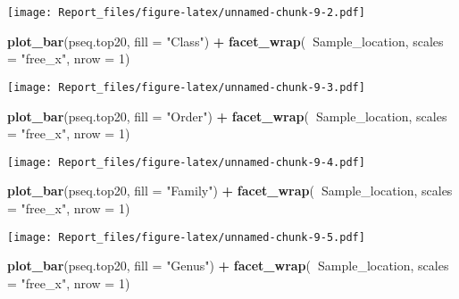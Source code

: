\documentclass[]{article}
\newenvironment{Shaded}{\begin{snugshade}}{\end{snugshade}}
\newcommand{\DataTypeTok}[1]{\textcolor[rgb]{0.13,0.29,0.53}{#1}}
\newcommand{\DecValTok}[1]{\textcolor[rgb]{0.00,0.00,0.81}{#1}}
\newcommand{\KeywordTok}[1]{\textcolor[rgb]{0.13,0.29,0.53}{\textbf{#1}}}
\newcommand{\NormalTok}[1]{#1}
\newcommand{\OperatorTok}[1]{\textcolor[rgb]{0.81,0.36,0.00}{\textbf{#1}}}
\newcommand{\StringTok}[1]{\textcolor[rgb]{0.31,0.60,0.02}{#1}}
\begin{document}
\texttt{[image: Report\_files/figure-latex/unnamed-chunk-9-2.pdf]}

\begin{Shaded}
\begin{Highlighting}[]
\KeywordTok{plot_bar}\NormalTok{(pseq.top20, }\DataTypeTok{fill =} \StringTok{"Class"}\NormalTok{) }\OperatorTok{+}\StringTok{ }\KeywordTok{facet_wrap}\NormalTok{(}\OperatorTok{~}\NormalTok{Sample_location, }\DataTypeTok{scales =} \StringTok{"free_x"}\NormalTok{, }\DataTypeTok{nrow =} \DecValTok{1}\NormalTok{)}
\end{Highlighting}
\end{Shaded}

\texttt{[image: Report\_files/figure-latex/unnamed-chunk-9-3.pdf]}

\begin{Shaded}
\begin{Highlighting}[]
\KeywordTok{plot_bar}\NormalTok{(pseq.top20, }\DataTypeTok{fill =} \StringTok{"Order"}\NormalTok{) }\OperatorTok{+}\StringTok{ }\KeywordTok{facet_wrap}\NormalTok{(}\OperatorTok{~}\NormalTok{Sample_location, }\DataTypeTok{scales =} \StringTok{"free_x"}\NormalTok{, }\DataTypeTok{nrow =} \DecValTok{1}\NormalTok{)}
\end{Highlighting}
\end{Shaded}

\texttt{[image: Report\_files/figure-latex/unnamed-chunk-9-4.pdf]}

\begin{Shaded}
\begin{Highlighting}[]
\KeywordTok{plot_bar}\NormalTok{(pseq.top20, }\DataTypeTok{fill =} \StringTok{"Family"}\NormalTok{) }\OperatorTok{+}\StringTok{ }\KeywordTok{facet_wrap}\NormalTok{(}\OperatorTok{~}\NormalTok{Sample_location, }\DataTypeTok{scales =} \StringTok{"free_x"}\NormalTok{, }\DataTypeTok{nrow =} \DecValTok{1}\NormalTok{)}
\end{Highlighting}
\end{Shaded}

\texttt{[image: Report\_files/figure-latex/unnamed-chunk-9-5.pdf]}

\begin{Shaded}
\begin{Highlighting}[]
\KeywordTok{plot_bar}\NormalTok{(pseq.top20, }\DataTypeTok{fill =} \StringTok{"Genus"}\NormalTok{) }\OperatorTok{+}\StringTok{ }\KeywordTok{facet_wrap}\NormalTok{(}\OperatorTok{~}\NormalTok{Sample_location, }\DataTypeTok{scales =} \StringTok{"free_x"}\NormalTok{, }\DataTypeTok{nrow =} \DecValTok{1}\NormalTok{)}
\end{Highlighting}
\end{Shaded}
\end{document}
